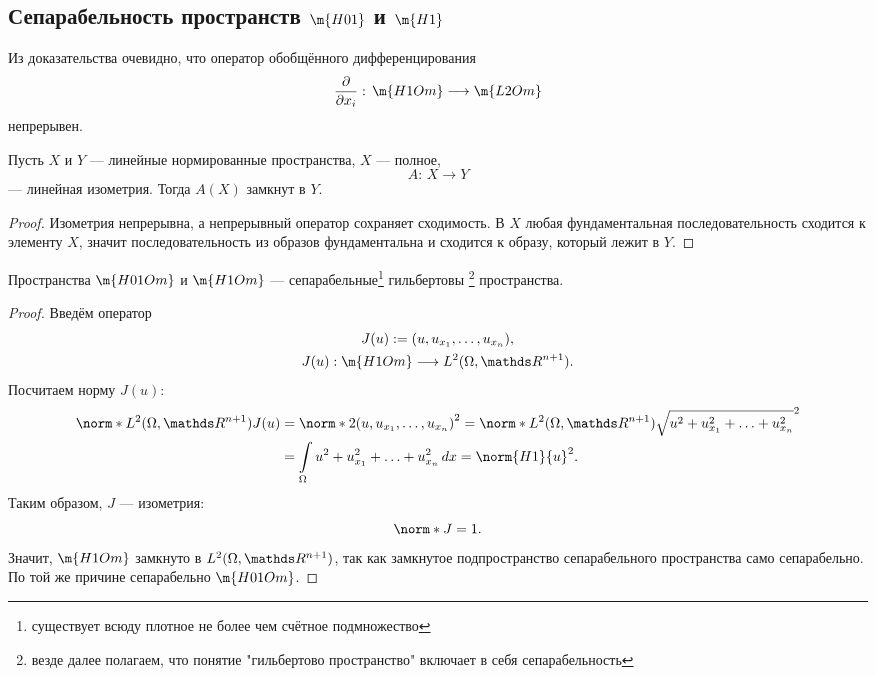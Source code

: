 \subsection{Сепарабельность пространств $\m{H01}$ и $\m{H1}$}

\begin{note} Из доказательства очевидно, что оператор обобщённого дифференцирования
$$ \pder{x_i}: \, \m{H1Om} \longrightarrow \m{L2Om}$$
непрерывен.
\end{note}

\begin{reminder} Пусть $X$ и $Y$ --- линейные нормированные пространства, $X$ --- полное, 
$$A: \, X \longrightarrow Y$$
--- линейная изометрия. Тогда $A(X)$ замкнут в $Y$.
\end{reminder}
\begin{proof}
Изометрия непрерывна, а непрерывный оператор сохраняет сходимость. В $X$ любая фундаментальная последовательность сходится к элементу $X$, значит последовательность из образов фундаментальна и сходится к образу, который лежит в $Y$.

\end{proof}

\begin{theorem} Пространства $\m{H01Om}$ и $\m{H1Om}$ --- сепарабельные\footnote{существует всюду плотное не более чем счётное подмножество} гильбертовы \footnote{везде далее полагаем, что понятие "гильбертово пространство" включает в себя сепарабельность} пространства.
\end{theorem}
\begin{proof}
Введём оператор
\begin{gather*}
J(u) := (u, u_{x_1}, \hdots, u_{x_n}), \\ 
J(u):  \m{H1Om} \longrightarrow L^2(\Omega, \real^{n+1}).
\end{gather*}
Посчитаем норму $J(u)$:
\begin{align*}
	\norm*{L^2(\Omega, \real^{n+1})} {J(u)} &= \norm*{2}{(u, u_{x_1}, \hdots, u_{x_n})}^2 = \norm*{L^2(\Omega, \real^{n+1})}{\sqrt{u^2 + u_{x_1}^2 + \hdots + u_{x_n}^2 }}^2 \\
	&= \int \limits_\Omega u^2 + u_{x_1}^2 + \hdots + u_{x_n}^2 \, dx = \norm{H1}{u}^2.
\end{align*}
Таким образом, $J$ --- изометрия:
$$ \norm*{}{J} = 1.$$
Значит, $\m{H1Om}$ замкнуто в $L^2(\Omega, \real^{n+1})$, так как замкнутое подпространство сепарабельного пространства само сепарабельно. По той же причине сепарабельно $\m{H01Om}$.

\end{proof}

